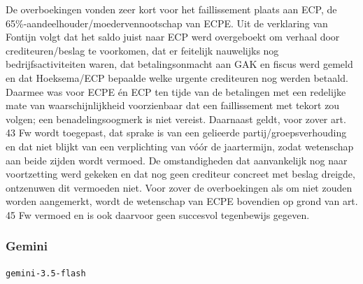\documentclass[
  dutch,
  a4paper,
]{article}
\begin{document}
De overboekingen vonden zeer kort voor het faillissement plaats aan ECP, de 65\%-aandeelhouder/moedervennootschap van ECPE. Uit de verklaring van Fontijn volgt dat het saldo juist naar ECP werd overgeboekt om verhaal door crediteuren/beslag te voorkomen, dat er feitelijk nauwelijks nog bedrijfsactiviteiten waren, dat betalingsonmacht aan GAK en fiscus werd gemeld en dat Hoeksema/ECP bepaalde welke urgente crediteuren nog werden betaald. Daarmee was voor ECPE én ECP ten tijde van de betalingen met een redelijke mate van waarschijnlijkheid voorzienbaar dat een faillissement met tekort zou volgen; een benadelingsoogmerk is niet vereist. Daarnaast geldt, voor zover art. 43 Fw wordt toegepast, dat sprake is van een gelieerde partij/groepsverhouding en dat niet blijkt van een verplichting van vóór de jaartermijn, zodat wetenschap aan beide zijden wordt vermoed. De omstandigheden dat aanvankelijk nog naar voortzetting werd gekeken en dat nog geen crediteur concreet met beslag dreigde, ontzenuwen dit vermoeden niet. Voor zover de overboekingen als om niet zouden worden aangemerkt, wordt de wetenschap van ECPE bovendien op grond van art. 45 Fw vermoed en is ook daarvoor geen succesvol tegenbewijs gegeven.

\newpage


\subsubsection{Gemini}\label{gemini-16}

\texttt{gemini-3.5-flash}
\end{document}
